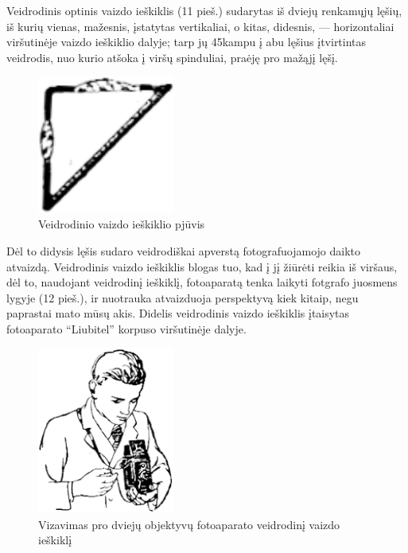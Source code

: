 \documentclass{book}
\begin{document}
					Veidrodinis optinis vaizdo ieškiklis (11 pieš.) sudarytas iš dviejų renkamųjų lęšių, iš kurių vienas, mažesnis, įstatytas vertikaliai, o kitas, didesnis, --- horizontaliai viršutinėje vaizdo ieškiklio dalyje; tarp jų 45\degree kampu į abu lęšius įtvirtintas veidrodis, nuo kurio atšoka į viršų spinduliai, praėję pro mažąjį lęšį.
					\begin{figure}[h]
						\centering
						\includegraphics[width=0.4\textwidth]{11-pav}
						\caption{Veidrodinio vaizdo ieškiklio pjūvis}
						\label{fig:11}
					\end{figure}
					Dėl to didysis lęšis sudaro veidrodiškai apverstą fotografuojamojo daikto atvaizdą. Veidrodinis vaizdo ieškiklis blogas tuo, kad į jį žiūrėti reikia iš viršaus, dėl to, naudojant veidrodinį ieškiklį, fotoaparatą tenka laikyti fotgrafo juosmens lygyje (12 pieš.), ir nuotrauka atvaizduoja perspektyvą kiek kitaip, negu paprastai mato mūsų akis. Didelis veidrodinis vaizdo ieškiklis įtaisytas fotoaparato ``Liubitel'' korpuso viršutinėje dalyje.
					\begin{figure}[h]
						\centering
						\includegraphics[width=0.4\textwidth]{12-pav}
						\caption{Vizavimas pro dviejų objektyvų fotoaparato veidrodinį vaizdo ieškiklį}
						\label{fig:12}
					\end{figure}
\end{document}
